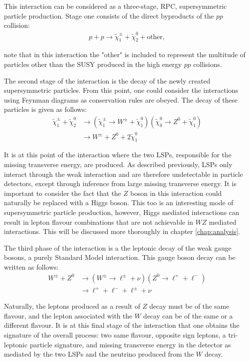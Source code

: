 This interaction can be considered as a three-stage, RPC, supersymmetric particle production.
Stage one consists of the direct byproducts of the $pp$ collision:
\begin{align}
p + p \rightarrow \tilde{\chi}^{\pm}_{1} + \tilde{\chi}^{0}_{2} + \textrm{other},
\end{align}

\noindent note that in this interaction the "other" is included to represent the multitude of particles other than the SUSY produced in the high energy $pp$ collisions.

The second stage of the interaction is the decay of the newly created supersymmetric particles.
From this point, one could consider the interactions using Feynman diagrams as conservation rules are obeyed.
The decay of these particles is given as follows:
\begin{align}
\tilde{\chi}^{\pm}_{1} + \tilde{\chi}^{0}_{2} &\rightarrow (\tilde{\chi}^{\pm}_{1} \rightarrow W^{\pm} + \tilde{\chi}^{0}_{1})(\tilde{\chi}^{0}_{0} \rightarrow Z^{0} + \tilde{\chi}^{0}_{1}) \\
&\rightarrow W^{\pm} + Z^{0} + 2 \tilde{\chi}^{0}_{1}
\end{align}

\noindent It is at this point of the interaction where the two LSPs, responsible for the missing transverse energy, are produced. 
As described previously, LSPs only interact through the weak interaction and are therefore undetectable in particle detectors, except through inference from large missing transverse energy.
It is important to consider the fact that the $Z$ boson in this interaction could naturally be replaced with a Higgs boson.
This too is an interesting mode of supersymmetric particle production, however, Higgs mediated interactions can result in lepton flavour combinations that are not achievable in $WZ$ mediated interactions.
This will be discussed more thoroughly in chapter \ref{chap:analysis}.

The third phase of the interaction is a the leptonic decay of the weak gauge bosons, a purely Standard Model interaction.
This gauge boson decay can be written as follows:
\begin{align}
W^{\pm} + Z^{0} &\rightarrow (W^{\pm} \rightarrow \ell^{\pm} + \nu) (Z^{0} \rightarrow \ell^{+} + \ell^{-}) \\
& \rightarrow \ell^{+} + \ell^{-} + \ell^{\pm} + \nu
\end{align}

\indent Naturally, the leptons produced as a result of $Z$ decay must be of the same flavour, and the lepton associated with the $W$ decay can be of the same or a different flavour.
It is at this final stage of the interaction that one obtains the signature of the overall process: two same flavour, opposite sign leptons, a tri-leptonic particle signature, and missing transverse energy in the detector as mediated by the two LSPs and the neutrino produced from the $W$ decay.